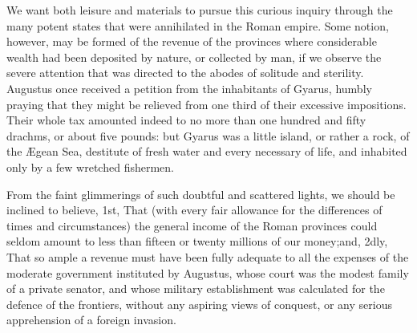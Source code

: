 
We want both leisure and materials to
pursue this curious inquiry through the many potent states that
were annihilated in the Roman empire. Some notion, however, may
be formed of the revenue of the provinces where considerable
wealth had been deposited by nature, or collected by man, if we
observe the severe attention that was directed to the abodes of
solitude and sterility. Augustus once received a petition from
the inhabitants of Gyarus, humbly praying that they might be
relieved from one third of their excessive impositions. Their
whole tax amounted indeed to no more than one hundred and fifty
drachms, or about five pounds: but Gyarus was a little island, or
rather a rock, of the Ægean Sea, destitute of fresh water and
every necessary of life, and inhabited only by a few wretched
fishermen.\footnotemark[95]


From the faint glimmerings of such doubtful and scattered lights,
we should be inclined to believe, 1st, That (with every fair
allowance for the differences of times and circumstances) the
general income of the Roman provinces could seldom amount to less
than fifteen or twenty millions of our money;\footnotemark[96] and, 2dly, That
so ample a revenue must have been fully adequate to all the
expenses of the moderate government instituted by Augustus, whose
court was the modest family of a private senator, and whose
military establishment was calculated for the defence of the
frontiers, without any aspiring views of conquest, or any serious
apprehension of a foreign invasion.


